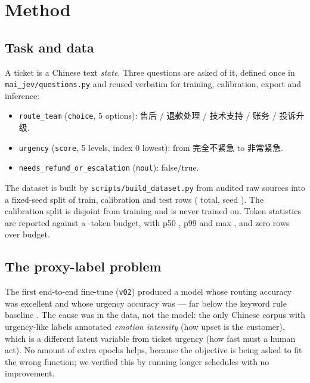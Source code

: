 \documentclass[11pt,a4paper]{article}
\begin{document}
\section{Method}

\subsection{Task and data}

A ticket is a Chinese text \emph{state}. Three questions are asked of it, defined once in \texttt{mai\_jev/questions.py} and reused verbatim for training, calibration, export and inference:

\begin{itemize}
  \item \texttt{route\_team} (\texttt{choice}, 5 options): 售后 / 退款处理 / 技术支持 / 账务 / 投诉升级.
  \item \texttt{urgency} (\texttt{score}, 5 levels, index 0 lowest): from 完全不紧急 to 非常紧急.
  \item \texttt{needs\_refund\_or\_escalation} (\texttt{noul}): false/true.
\end{itemize}

The dataset is built by \texttt{scripts/build\_dataset.py} from audited raw sources into a fixed-seed split of \RowsTrain{} train, \RowsCalib{} calibration and \RowsTest{} test rows (\DataTotalRows{} total, seed \SeedAll{}). The calibration split is disjoint from training and is never trained on. Token statistics are reported against a \TokBudget{}-token budget, with p50 \TokPFiveZero, p99 \TokPNineNine and max \TokMax, and zero rows over budget.

\subsection{The proxy-label problem}

The first end-to-end fine-tune (\texttt{v02}) produced a model whose routing accuracy was excellent and whose urgency accuracy was \AccScoreVZeroTwo{} --- far below the keyword rule baseline \RulesAccScore{}. The cause was in the data, not the model: the only Chinese corpus with urgency-like labels annotated \emph{emotion intensity} (how upset is the customer), which is a different latent variable from ticket urgency (how fast must a human act). No amount of extra epochs helps, because the objective is being asked to fit the wrong function; we verified this by running longer schedules with no improvement.
\end{document}
